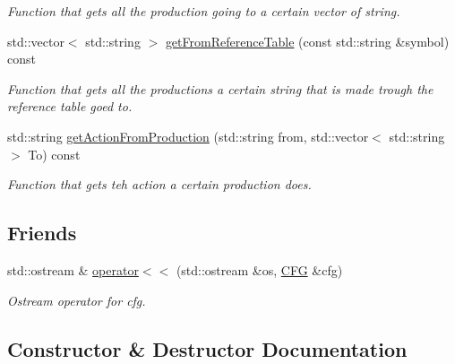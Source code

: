 \begin{DoxyCompactItemize}
\begin{DoxyCompactList}\small\item\em Function that gets all the production going to a certain vector of string. \end{DoxyCompactList}\item 
std\+::vector$<$ std\+::string $>$ \hyperlink{classCFG_aefe08c649b58b046ee052b3419384509}{get\+From\+Reference\+Table} (const std\+::string \&symbol) const
\begin{DoxyCompactList}\small\item\em Function that gets all the productions a certain string that is made trough the reference table goed to. \end{DoxyCompactList}\item 
std\+::string \hyperlink{classCFG_a89ff398f5c7797b921fab30648a92b8b}{get\+Action\+From\+Production} (std\+::string from, std\+::vector$<$ std\+::string $>$ To) const
\begin{DoxyCompactList}\small\item\em Function that gets teh action a certain production does. \end{DoxyCompactList}\end{DoxyCompactItemize}
\subsection*{Friends}
\begin{DoxyCompactItemize}
\item 
std\+::ostream \& \hyperlink{classCFG_aa896f5667e2f966fb942244b746beaad}{operator$<$$<$} (std\+::ostream \&os, \hyperlink{classCFG}{C\+FG} \&cfg)
\begin{DoxyCompactList}\small\item\em Ostream operator for cfg. \end{DoxyCompactList}\end{DoxyCompactItemize}


\subsection{Constructor \& Destructor Documentation}
\mbox{\label{classCFG_aaa7b7d1a1686837e3adbad02a60c7222}} 
